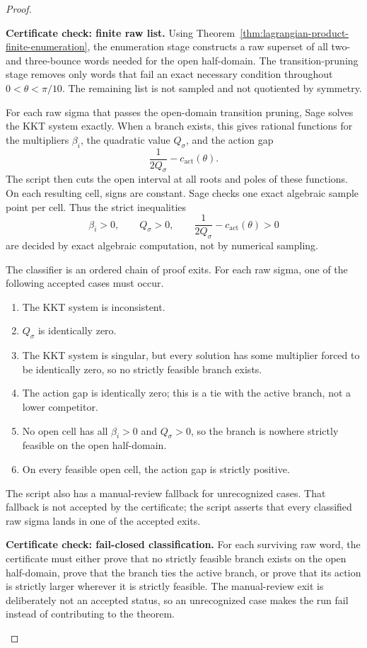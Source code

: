 \begin{proof}
\begin{certificatecheck}
\noindent\textbf{Certificate check: finite raw list.}
Using Theorem~\ref{thm:lagrangian-product-finite-enumeration}, the enumeration
stage constructs a raw superset of all two- and three-bounce words needed for
the open half-domain. The transition-pruning stage removes only words that fail
an exact necessary condition throughout \(0<\theta<\pi/10\). The remaining list
is not sampled and not quotiented by symmetry.
\end{certificatecheck}

For each raw sigma that passes the open-domain transition pruning, Sage solves
the KKT system exactly. When a branch exists, this gives rational functions for
the multipliers \(\beta_i\), the quadratic value \(Q_\sigma\), and the action
gap
\[
  \frac{1}{2Q_\sigma} - c_{\mathrm{act}}(\theta).
\]
The script then cuts the open interval at all roots and poles of these
functions. On each resulting cell, signs are constant. Sage checks one exact
algebraic sample point per cell. Thus the strict inequalities
\[
  \beta_i>0,\qquad Q_\sigma>0,\qquad
  \frac{1}{2Q_\sigma}-c_{\mathrm{act}}(\theta)>0
\]
are decided by exact algebraic computation, not by numerical sampling.

The classifier is an ordered chain of proof exits. For each raw sigma, one of
the following accepted cases must occur.
\begin{enumerate}
  \item The KKT system is inconsistent.
  \item \(Q_\sigma\) is identically zero.
  \item The KKT system is singular, but every solution has some multiplier
    forced to be identically zero, so no strictly feasible branch exists.
  \item The action gap is identically zero; this is a tie with the active
    branch, not a lower competitor.
  \item No open cell has all \(\beta_i>0\) and \(Q_\sigma>0\), so the branch is
    nowhere strictly feasible on the open half-domain.
  \item On every feasible open cell, the action gap is strictly positive.
\end{enumerate}
The script also has a manual-review fallback for unrecognized cases. That
fallback is not accepted by the certificate; the script asserts that every
classified raw sigma lands in one of the accepted exits.

\begin{certificatecheck}
\noindent\textbf{Certificate check: fail-closed classification.}
For each surviving raw word, the certificate must either prove that no strictly
feasible branch exists on the open half-domain, prove that the branch ties the
active branch, or prove that its action is strictly larger wherever it is
strictly feasible. The manual-review exit is deliberately not an accepted
status, so an unrecognized case makes the run fail instead of contributing to
the theorem.
\end{certificatecheck}


\end{proof}
